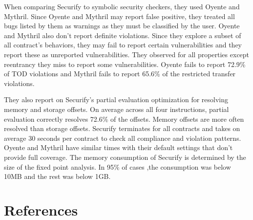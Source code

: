 \documentclass{article}
\begin{document}
When comparing Securify to symbolic security checkers, they used Oyente and Mythril. Since Oyente and Mythril may report false positive, they treated all bugs listed by them as warnings as they must be classified by the user. Oyente and Mythril also don't report definite violations. Since they explore a subset of all contract's behaviors, they may fail to report certain vulnerabilities and they report these as unreported vulnerabilities. They observed for all properties except reentrancy they miss to report some vulnerabilities. Oyente fails to report 72.9\% of TOD violations and Mythril fails to report 65.6\% of the restricted transfer violations. 

They also report on Securify's partial evaluation optimization for resolving memory and storage offsets. On average across all four instructions, partial evaluation correctly resolves 72.6\% of the offsets. Memory offsets are more often resolved than storage offsets. Securify terminates for all contracts and takes on average 30 seconds per contract to check all compliance and violation patterns. Oyente and Mythril have similar times with their default settings that don't provide full coverage. The memory consumption of Securify is determined by the size of the fixed point analysis. In 95\% of cases ,the consumption was below 10MB and the rest was below 1GB.

\section{References}
\printbibliography
\end{document}
